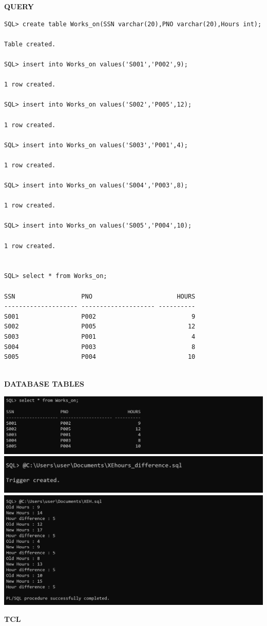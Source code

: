 \documentclass[a4paper,12pt]{report}
\begin{document}
\begin{flushleft}
\textbf{QUERY }
\end{flushleft}
 \begin{verbatim}
SQL> create table Works_on(SSN varchar(20),PNO varchar(20),Hours int);

Table created.
 
SQL> insert into Works_on values('S001','P002',9);

1 row created.

SQL> insert into Works_on values('S002','P005',12);

1 row created.

SQL> insert into Works_on values('S003','P001',4);

1 row created.

SQL> insert into Works_on values('S004','P003',8);

1 row created.

SQL> insert into Works_on values('S005','P004',10);

1 row created.


SQL> select * from Works_on;

SSN                  PNO                       HOURS
-------------------- -------------------- ----------
S001                 P002                          9
S002                 P005                         12
S003                 P001                          4
S004                 P003                          8
S005                 P004                         10


\end{verbatim}
\begin{flushleft}
\textbf{DATABASE TABLES}
\end{flushleft}
\includegraphics[scale=0.4]{T2A.png}
\includegraphics[scale=0.523]{T2B.png}
\includegraphics[scale=0.4]{T2C.png}
\newpage
\begin{center}
\large\textbf{TCL}
\end{center}
\end{document}
